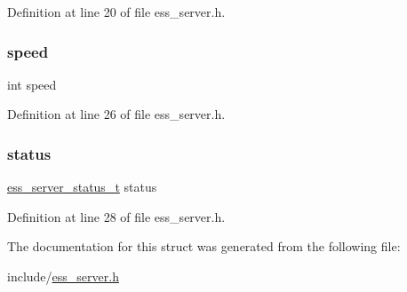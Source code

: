 Definition at line 20 of file ess\+\_\+server.\+h.

\mbox{\label{structess__server_a218b4f7c6cc2681a99c23a3b089d68b1}} 
\subsubsection{\texorpdfstring{speed}{speed}}
{\footnotesize\ttfamily int speed}



Definition at line 26 of file ess\+\_\+server.\+h.

\mbox{\label{structess__server_af34befa103928930a907b2eb5cc4739c}} 
\subsubsection{\texorpdfstring{status}{status}}
{\footnotesize\ttfamily \hyperlink{ess__server_8h_a66019638fd44eba9d951ec93754c7b8d}{ess\+\_\+server\+\_\+status\+\_\+t} status}



Definition at line 28 of file ess\+\_\+server.\+h.



The documentation for this struct was generated from the following file\+:\begin{DoxyCompactItemize}
\item 
include/\hyperlink{ess__server_8h}{ess\+\_\+server.\+h}\end{DoxyCompactItemize}
